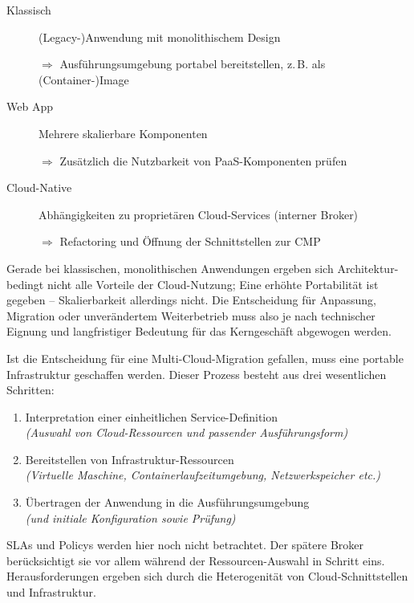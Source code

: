 \begin{description}
	
	\item[Klassisch] (Legacy-)Anwendung mit monolithischem Design
	
	$\Rightarrow$ Ausführungsumgebung portabel bereitstellen, z.\,B. als (Container-)Image
	
	\item[Web App] Mehrere skalierbare Komponenten
	
	$\Rightarrow$ Zusätzlich die Nutzbarkeit von PaaS-Komponenten prüfen
	
	\item[Cloud-Native] Abhängigkeiten zu proprietären Cloud-Services (interner Broker)
	
	$\Rightarrow$ Refactoring und Öffnung der Schnittstellen zur CMP
	
\end{description}

\noindent
Gerade bei klassischen, monolithischen Anwendungen ergeben sich Architektur-bedingt nicht alle Vorteile der Cloud-Nutzung; Eine erhöhte Portabilität ist gegeben --  Skalierbarkeit allerdings nicht. Die Entscheidung für Anpassung, Migration oder unverändertem Weiterbetrieb muss also je nach technischer Eignung und langfristiger Bedeutung für das Kerngeschäft abgewogen werden.

Ist die Entscheidung für eine Multi-Cloud-Migration gefallen, muss eine portable Infrastruktur geschaffen werden. Dieser Prozess besteht aus drei wesentlichen Schritten:

\begin{enumerate}
	
	\item Interpretation einer einheitlichen Service-Definition
	\\\emph{(Auswahl von Cloud-Ressourcen und passender Ausführungsform)}
	
	\item Bereitstellen von Infrastruktur-Ressourcen 
	\\\emph{(Virtuelle Maschine, Containerlaufzeitumgebung, Netzwerkspeicher etc.)}
	
	\item Übertragen der Anwendung in die Ausführungsumgebung
	\\\emph{(und initiale Konfiguration sowie Prüfung)}
		
\end{enumerate}

\noindent
SLAs und Policys werden hier noch nicht betrachtet. Der spätere Broker berücksichtigt sie vor allem während der Ressourcen-Auswahl in Schritt eins. Herausforderungen ergeben sich durch die Heterogenität von Cloud-Schnittstellen und Infrastruktur.

